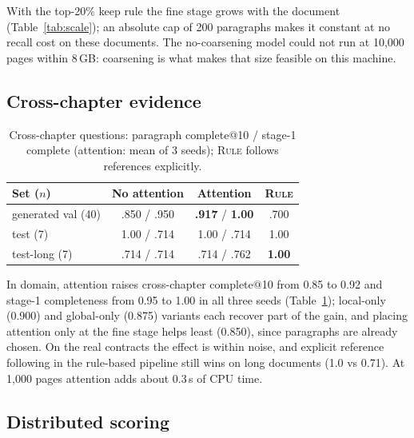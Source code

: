 \documentclass[11pt]{article}
\newcommand{\rulepipe}{\textsc{Rule}}
\begin{document}
With the top-20\% keep rule the fine stage grows with the document (Table~\ref{tab:scale}); an absolute cap of 200 paragraphs makes it constant at no recall cost on these documents. The no-coarsening model could not run at 10,000 pages within 8\,GB: coarsening is what makes that size feasible on this machine.

\subsection{Cross-chapter evidence}

\begin{table}[t]
\centering
\scriptsize
\begin{tabular}{@{}lccc@{}}
\toprule
\textbf{Set ($n$)} & \textbf{No attention} & \textbf{Attention} & \textbf{\rulepipe{}} \\
\midrule
generated val (40) & .850 / .950 & \textbf{.917} / \textbf{1.00} & .700 \\
test (7) & 1.00 / .714 & 1.00 / .714 & 1.00 \\
test-long (7) & .714 / .714 & .714 / .762 & \textbf{1.00} \\
\bottomrule
\end{tabular}
\caption{Cross-chapter questions: paragraph complete@10 / stage-1 complete (attention: mean of 3 seeds); \rulepipe{} follows references explicitly.}
\label{tab:crosschapter}
\end{table}

In domain, attention raises cross-chapter complete@10 from 0.85 to 0.92 and stage-1 completeness from 0.95 to 1.00 in all three seeds (Table~\ref{tab:crosschapter}); local-only (0.900) and global-only (0.875) variants each recover part of the gain, and placing attention only at the fine stage helps least (0.850), since paragraphs are already chosen. On the real contracts the effect is within noise, and explicit reference following in the rule-based pipeline still wins on long documents (1.0 vs 0.71). At 1,000 pages attention adds about 0.3\,s of CPU time.

\subsection{Distributed scoring}
\end{document}
